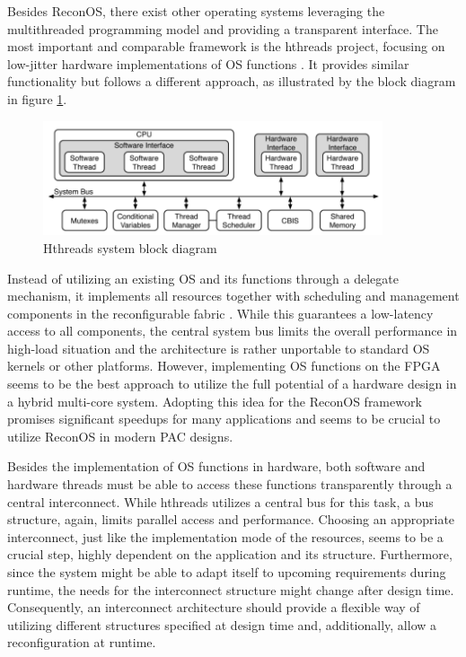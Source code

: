 Besides ReconOS, there exist other operating systems leveraging the
multithreaded programming model and providing a transparent interface. The
most important and comparable framework is the hthreads project, focusing on
low-jitter hardware implementations of \ac{OS} functions \citep{AHK14}. It
provides similar functionality but follows a different approach, as
illustrated by the block diagram in figure \ref{fig:hthreads}.
\begin{figure}[tb]
	\centering
	\includegraphics[width=10cm]{../figures/hthreads}
	\caption{Hthreads system block diagram \citep{ASA08}}
	\label{fig:hthreads}
\end{figure}
Instead of utilizing an existing \ac{OS} and its functions through a delegate
mechanism, it implements all resources together with scheduling and management
components in the reconfigurable fabric \citep{ASA08}. While this guarantees a
low-latency access to all components, the central system bus limits the
overall performance in high-load situation and the architecture is rather
unportable to standard \ac{OS} kernels or other platforms. However,
implementing  \ac{OS} functions on the \ac{FPGA} seems to be the best approach
to utilize the full potential of a hardware design in a hybrid multi-core
system. Adopting this idea for the ReconOS framework promises significant
speedups for many applications and seems to be crucial to utilize ReconOS in
modern \ac{PAC} designs.

Besides the implementation of \ac{OS} functions in hardware, both software and
hardware threads must be able to access these functions transparently through
a central interconnect. While hthreads utilizes a central bus for this task, a
bus structure, again, limits parallel access and performance. Choosing an
appropriate interconnect, just like the implementation mode of the resources,
seems to be a crucial step, highly dependent on the application and its
structure. Furthermore, since the system might be able to adapt itself to
upcoming requirements during runtime, the needs for the interconnect structure
might change after design time. Consequently, an interconnect architecture
should provide a flexible way of utilizing different structures specified at
design time and, additionally, allow a reconfiguration at runtime.

